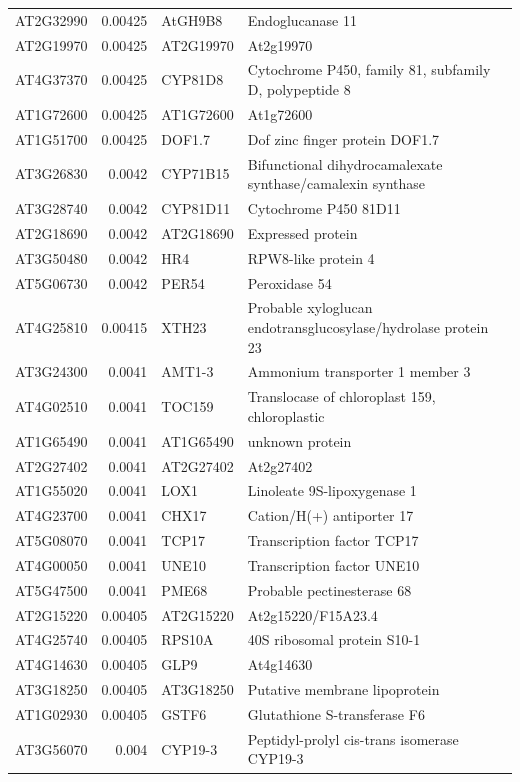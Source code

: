 \documentclass[11pt]{article}
\begin{document}
\begin{center}
\begin{tabular}{lrll}
AT2G32990 & 0.00425 & AtGH9B8 & Endoglucanase 11\\
AT2G19970 & 0.00425 & AT2G19970 & At2g19970\\
AT4G37370 & 0.00425 & CYP81D8 & Cytochrome P450, family 81, subfamily D, polypeptide 8\\
AT1G72600 & 0.00425 & AT1G72600 & At1g72600\\
AT1G51700 & 0.00425 & DOF1.7 & Dof zinc finger protein DOF1.7\\
AT3G26830 & 0.0042 & CYP71B15 & Bifunctional dihydrocamalexate synthase/camalexin synthase\\
AT3G28740 & 0.0042 & CYP81D11 & Cytochrome P450 81D11\\
AT2G18690 & 0.0042 & AT2G18690 & Expressed protein\\
AT3G50480 & 0.0042 & HR4 & RPW8-like protein 4\\
AT5G06730 & 0.0042 & PER54 & Peroxidase 54\\
AT4G25810 & 0.00415 & XTH23 & Probable xyloglucan endotransglucosylase/hydrolase protein 23\\
AT3G24300 & 0.0041 & AMT1-3 & Ammonium transporter 1 member 3\\
AT4G02510 & 0.0041 & TOC159 & Translocase of chloroplast 159, chloroplastic\\
AT1G65490 & 0.0041 & AT1G65490 & unknown protein\\
AT2G27402 & 0.0041 & AT2G27402 & At2g27402\\
AT1G55020 & 0.0041 & LOX1 & Linoleate 9S-lipoxygenase 1\\
AT4G23700 & 0.0041 & CHX17 & Cation/H(+) antiporter 17\\
AT5G08070 & 0.0041 & TCP17 & Transcription factor TCP17\\
AT4G00050 & 0.0041 & UNE10 & Transcription factor UNE10\\
AT5G47500 & 0.0041 & PME68 & Probable pectinesterase 68\\
AT2G15220 & 0.00405 & AT2G15220 & At2g15220/F15A23.4\\
AT4G25740 & 0.00405 & RPS10A & 40S ribosomal protein S10-1\\
AT4G14630 & 0.00405 & GLP9 & At4g14630\\
AT3G18250 & 0.00405 & AT3G18250 & Putative membrane lipoprotein\\
AT1G02930 & 0.00405 & GSTF6 & Glutathione S-transferase F6\\
AT3G56070 & 0.004 & CYP19-3 & Peptidyl-prolyl cis-trans isomerase CYP19-3\\

\end{tabular}
\end{center}
\end{document}
